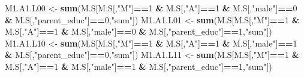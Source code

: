 \documentclass[
]{book}
\newenvironment{Shaded}{\begin{snugshade}}{\end{snugshade}}
\newcommand{\DecValTok}[1]{\textcolor[rgb]{0.00,0.00,0.81}{#1}}
\newcommand{\FunctionTok}[1]{\textcolor[rgb]{0.13,0.29,0.53}{\textbf{#1}}}
\newcommand{\NormalTok}[1]{#1}
\newcommand{\OtherTok}[1]{\textcolor[rgb]{0.56,0.35,0.01}{#1}}
\newcommand{\SpecialCharTok}[1]{\textcolor[rgb]{0.81,0.36,0.00}{\textbf{#1}}}
\newcommand{\StringTok}[1]{\textcolor[rgb]{0.31,0.60,0.02}{#1}}
\begin{document}
\begin{Shaded}
\begin{Highlighting}[]
\NormalTok{  M1.A1.L00 }\OtherTok{\textless{}{-}} \FunctionTok{sum}\NormalTok{(M.S[M.S[,}\StringTok{"M"}\NormalTok{]}\SpecialCharTok{==}\DecValTok{1} \SpecialCharTok{\&}\NormalTok{ M.S[,}\StringTok{"A"}\NormalTok{]}\SpecialCharTok{==}\DecValTok{1} \SpecialCharTok{\&}\NormalTok{ M.S[,}\StringTok{"male"}\NormalTok{]}\SpecialCharTok{==}\DecValTok{0} \SpecialCharTok{\&} 
\NormalTok{                         M.S[,}\StringTok{"parent\_educ"}\NormalTok{]}\SpecialCharTok{==}\DecValTok{0}\NormalTok{,}\StringTok{"sum"}\NormalTok{])}
\NormalTok{  M1.A1.L01 }\OtherTok{\textless{}{-}} \FunctionTok{sum}\NormalTok{(M.S[M.S[,}\StringTok{"M"}\NormalTok{]}\SpecialCharTok{==}\DecValTok{1} \SpecialCharTok{\&}\NormalTok{ M.S[,}\StringTok{"A"}\NormalTok{]}\SpecialCharTok{==}\DecValTok{1} \SpecialCharTok{\&}\NormalTok{ M.S[,}\StringTok{"male"}\NormalTok{]}\SpecialCharTok{==}\DecValTok{0} \SpecialCharTok{\&} 
\NormalTok{                         M.S[,}\StringTok{"parent\_educ"}\NormalTok{]}\SpecialCharTok{==}\DecValTok{1}\NormalTok{,}\StringTok{"sum"}\NormalTok{])}
\NormalTok{  M1.A1.L10 }\OtherTok{\textless{}{-}} \FunctionTok{sum}\NormalTok{(M.S[M.S[,}\StringTok{"M"}\NormalTok{]}\SpecialCharTok{==}\DecValTok{1} \SpecialCharTok{\&}\NormalTok{ M.S[,}\StringTok{"A"}\NormalTok{]}\SpecialCharTok{==}\DecValTok{1} \SpecialCharTok{\&}\NormalTok{ M.S[,}\StringTok{"male"}\NormalTok{]}\SpecialCharTok{==}\DecValTok{1} \SpecialCharTok{\&} 
\NormalTok{                         M.S[,}\StringTok{"parent\_educ"}\NormalTok{]}\SpecialCharTok{==}\DecValTok{0}\NormalTok{,}\StringTok{"sum"}\NormalTok{])}
\NormalTok{  M1.A1.L11 }\OtherTok{\textless{}{-}} \FunctionTok{sum}\NormalTok{(M.S[M.S[,}\StringTok{"M"}\NormalTok{]}\SpecialCharTok{==}\DecValTok{1} \SpecialCharTok{\&}\NormalTok{ M.S[,}\StringTok{"A"}\NormalTok{]}\SpecialCharTok{==}\DecValTok{1} \SpecialCharTok{\&}\NormalTok{ M.S[,}\StringTok{"male"}\NormalTok{]}\SpecialCharTok{==}\DecValTok{1} \SpecialCharTok{\&} 
\NormalTok{                         M.S[,}\StringTok{"parent\_educ"}\NormalTok{]}\SpecialCharTok{==}\DecValTok{1}\NormalTok{,}\StringTok{"sum"}\NormalTok{])}
  

\end{Highlighting}
\end{Shaded}
\end{document}
